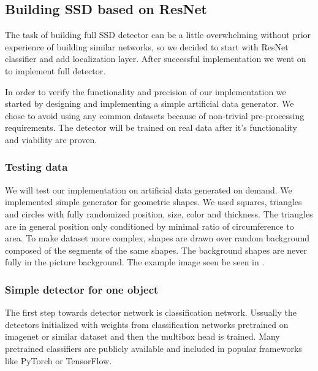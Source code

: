 \subsection{Building SSD based on ResNet}
The task of building full SSD detector can be a little overwhelming without prior experience of building similar networks, so we decided to start with ResNet classifier and add localization layer. After successful implementation we went on to implement full detector. 

In order to verify the functionality and precision of our implementation we started by designing and implementing a simple artificial data generator. We chose to avoid using any common datasets because of non-trivial pre-processing requirements. The detector will be trained on real data after it's functionality and viability are proven.

\subsubsection{Testing data}
We will test our implementation on artificial data generated on demand. We implemented simple generator for geometric shapes. We used squares, triangles and circles with fully randomized position, size, color and thickness. The triangles are in general position only conditioned by minimal ratio of circumference to area.
To make dataset more complex, shapes are drawn over random background composed of the segments of the same shapes. The background shapes are never fully in the picture background. The example image seen be seen in .






\subsubsection{Simple detector for one object}
The first step towards detector network is classification network. Ussually the detectors initialized with weights from classification networks pretrained on imagenet or similar dataset and then the multibox head is trained. Many pretrained classifiers are publicly available and included in popular frameworks like PyTorch or TensorFlow.

